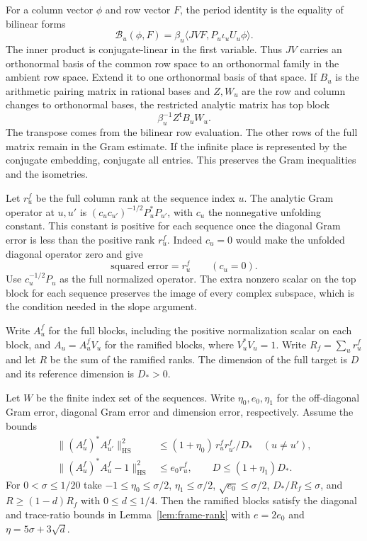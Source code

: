 For a column vector \(\phi\) and row vector \(F\), the
period identity is the equality of bilinear forms
\[
   \mathcal B_u(\phi,F)
    =\beta_u \langle J V F, P_u\iota_u U_u\phi\rangle .
\]
The inner product is conjugate-linear in the first
variable. Thus \(JV\) carries an orthonormal basis of the common
row space to an orthonormal family in the ambient row space.
Extend it to one orthonormal basis of that space. If \(B_u\)
is the arithmetic pairing matrix in rational bases and \(Z,W_u\)
are the row and column changes to orthonormal bases, the restricted analytic matrix has top block
\[
  \beta_u^{-1}Z^{\mathsf t}B_uW_u .
\] The transpose comes from the bilinear
row evaluation. The other rows of the full matrix remain in the
Gram estimate. If the infinite place is represented by the
conjugate embedding, conjugate all entries. This preserves the
Gram inequalities and the isometries.

Let \(r_u^f\) be the full column rank at the sequence index \(u\).
The analytic Gram operator at \(u,u'\) is
\((c_u c_{u'})^{-1/2}P_u^*P_{u'}\), with \(c_u\) the
nonnegative unfolding constant. This constant is positive
for each sequence once the diagonal Gram error is
less than the positive rank \(r_u^f\). Indeed \(c_u=0\) would make the unfolded diagonal operator zero and give
\[
 \text{squared error}=r_u^f\qquad(c_u=0).
\] Use \(c_u^{-1/2}P_u\) as
the full normalized operator. The extra nonzero scalar on
the top block for each sequence preserves the image of every
complex subspace, which is the condition needed in the
slope argument.

Write \(A_u^f\)
for the full blocks, including the positive normalization
scalar on each block, and \(A_u=A_u^f V_u\) for the
ramified blocks, where \(V_u^*V_u=1\).
Write \(R_f=\sum_u r_u^f\) and let \(R\) be the sum of the
ramified ranks. The dimension of the
full target is \(D\) and its reference dimension is \(D_*>0\).

\begin{lemma}\label{lem:gram-compression}
Let \(W\) be the finite index set of the sequences. Write
\(\eta_0,e_0,\eta_1\) for the off-diagonal Gram error,
diagonal Gram error and dimension error, respectively.
Assume the bounds
\[
\begin{split}
 \|(A_u^f)^*A_{u'}^f\|_{\mathrm{HS}}^2
       &\le (1+\eta_0)\,r_u^f r_{u'}^f/D_*
                         \quad (u\ne u'),\\
 \|(A_u^f)^*A_u^f-1\|_{\mathrm{HS}}^2&\le e_0 r_u^f,\qquad
 D\le(1+\eta_1)D_* .
\end{split}
\]
For \(0<\sigma\le1/20\) take
\(-1\le\eta_0\le\sigma/2\), \(\eta_1\le\sigma/2\),
\(\sqrt{e_0}\le\sigma/2\), \(D_*/R_f\le\sigma\), and
\(R\ge(1-d)R_f\) with \(0\le d\le1/4\).
Then the ramified blocks satisfy the diagonal and trace-ratio bounds
in Lemma~\ref{lem:frame-rank} with \(e=2e_0\) and
\(\eta=5\sigma+3\sqrt d\).
\end{lemma}

